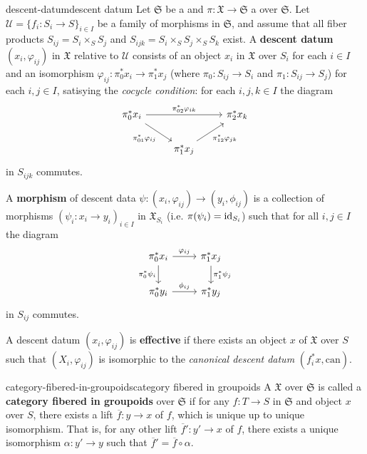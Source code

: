 \begin{topic}{descent-datum}{descent datum}
    Let $\mathfrak{S}$ be a  and $\pi : \mathfrak{X} \to \mathfrak{S}$ a  over $\mathfrak{S}$. Let $\mathcal{U} = \{ f_i : S_i \to S \}_{i \in I}$ be a family of morphisms in $\mathfrak{S}$, and assume that all fiber products $S_{ij} = S_i \times_S S_j$ and $S_{ijk} = S_i \times_S S_j \times_S S_k$ exist. A \textbf{descent datum} $(x_i, \varphi_{ij})$ in $\mathfrak{X}$ relative to $\mathcal{U}$ consists of an object $x_i$ in $\mathfrak{X}$ over $S_i$ for each $i \in I$ and an isomorphism $\varphi_{ij} : \pi_0^* x_i \to \pi_1^* x_j$ (where $\pi_0 : S_{ij} \to S_i$ and $\pi_1 : S_{ij} \to S_j$) for each $i, j \in I$, satisying the \textit{cocycle condition}: for each $i, j, k \in I$ the diagram
    \[ \begin{tikzcd} \pi_0^* x_i \arrow{rr}{\pi_{02}^* \varphi_{ik}} \arrow[swap]{rd}{\pi_{01}^* \varphi_{ij}} && \pi_2^* x_k \\ & \pi_1^* x_j \arrow[swap]{ur}{\pi_{12}^* \varphi_{jk}} & \end{tikzcd} \]
    in $S_{ijk}$ commutes.
    
    A \textbf{morphism} of descent data $\psi : (x_i, \varphi_{ij}) \to (y_i, \phi_{ij})$ is a collection of morphisms $(\psi_i : x_i \to y_i)_{i \in I}$ in $\mathfrak{X}_{S_i}$ (i.e. $\pi(\psi_i) = \text{id}_{S_i}$) such that for all $i, j \in I$ the diagram
    \[ \begin{tikzcd} \pi_0^* x_i \arrow{r}{\varphi_{ij}} \arrow[swap]{d}{\pi_0^* \psi_i} & \pi_1^* x_j \arrow{d}{\pi_1^* \psi_j} \\ \pi_0^* y_i \arrow{r}{\phi_{ij}} & \pi_1^* y_j \end{tikzcd} \]
    in $S_{ij}$ commutes.
    
    A descent datum $(x_i, \varphi_{ij})$ is \textbf{effective} if there exists an object $x$ of $\mathfrak{X}$ over $S$ such that $(X_i, \varphi_{ij})$ is isomorphic to the \textit{canonical descent datum} $(f_i^* x, \text{can})$.
\end{topic}

\begin{topic}{category-fibered-in-groupoids}{category fibered in groupoids}
    A  $\mathfrak{X}$ over $\mathfrak{S}$ is called a \textbf{category fibered in groupoids} over $\mathfrak{S}$ if for any $f : T \to S$ in $\mathfrak{S}$ and object $x$ over $S$, there exists a lift $\overline{f} : y \to x$ of $f$, which is unique up to unique isomorphism. That is, for any other lift $\overline{f}' : y' \to x$ of $f$, there exists a unique isomorphism $\alpha : y' \to y$ such that $\overline{f}' = \overline{f} \circ \alpha$.
\end{topic}

